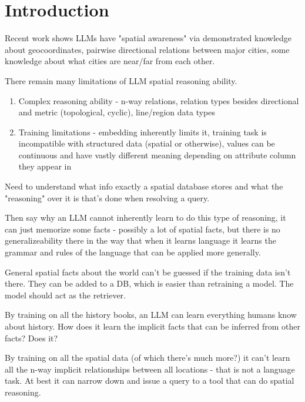 \section{Introduction}

\label{section:introduction}

Recent work shows LLMs have "spatial awareness" via demonstrated knowledge about geocoordinates, pairwise directional relations between major cities, some knowledge about what cities are near/far from each other.

There remain many limitations of LLM spatial reasoning ability.
\begin{enumerate}
    \item  Complex reasoning ability - n-way relations, relation types besides directional and metric (topological, cyclic), line/region data types
    \item Training limitations - embedding inherently limits it, training task is incompatible with structured data (spatial or otherwise), values can be continuous and have vastly different meaning depending on attribute column they appear in
\end{enumerate}


Need to understand what info exactly a spatial database stores and what the "reasoning" over it is that's done when resolving a query. 

Then say why an LLM cannot inherently learn to do this type of reasoning, it can just memorize some facts - possibly a lot of spatial facts, but there is no generalizeability there in the way that when it learns language it learns the grammar and rules of the language that can be applied more generally.

General spatial facts about the world can't be guessed if the training data isn't there. 
They can be added to a DB, which is easier than retraining a model. 
The model should act as the retriever.

By training on all the history books, an LLM can learn everything humans know about history.
How does it learn the implicit facts that can be inferred from other facts? Does it?

By training on all the spatial data (of which there's much more?) it can't learn all the n-way implicit relationships between all locations - that is not a language task. 
At best it can narrow down and issue a query to a tool that can do spatial reasoning.


